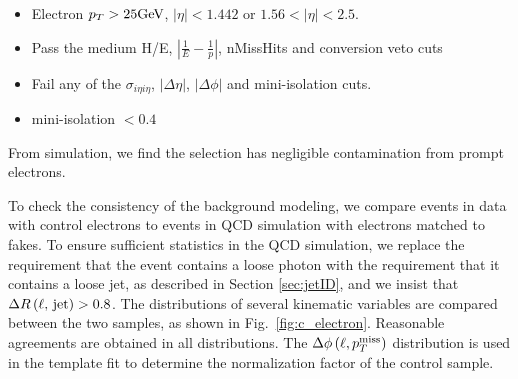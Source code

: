 \documentclass[thesis.tex]{subfiles}
\renewcommand\_{\textunderscore\allowbreak}
\begin{document}
\begin{itemize}
    \item Electron $p_T > 25\text{GeV}$, $|\eta| < 1.442$ or $1.56 < |\eta| < 2.5$.
    \item Pass the medium H/E, $|\frac{1}{E}-\frac{1}{p}|$, nMissHits and conversion veto cuts
    \item Fail any of the $\sigma_{i\eta i\eta}$, $|\Delta\eta|$, $|\Delta\phi|$ and mini-isolation cuts. 
		\item mini-isolation $< 0.4$
\end{itemize}
From simulation, we find the selection has negligible contamination from prompt
electrons.

To check the consistency of the background modeling, we compare events in data
with control electrons to events in QCD simulation with electrons matched to
fakes. To ensure sufficient statistics in the QCD simulation, we replace the
requirement that the event contains a loose photon with the requirement that it
contains a loose jet, as described in Section \ref{sec:jetID}, and we insist that
$\Delta R\left(\textrm{\ensuremath{\ell}, jet}\right) > 0.8$. The distributions of several
kinematic variables are compared between the two samples, as shown in
Fig.~\ref{fig:c_electron}. Reasonable agreements are obtained in all distributions.
The $\Delta\phi\left(\ell, p_T^\textrm{miss}\right)$ distribution
is used in the template fit to determine the normalization factor of the control
sample.
\end{document}
